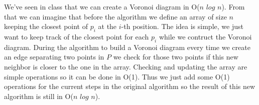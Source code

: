 We've seen in class that we can create a Voronoi diagram in O($n$ $log$ $n$). From that we can imagine that before the algorithm we define an array of size $n$ keeping the closest point of $p_i$ at the $i$-th position. The idea is simple, we just want to keep track of the closest point for each $p_i$ while we contruct the Voronoi diagram. During the algorithm to build a Voronoi diagram every time we create an edge separating two points in $P$ we check for those two points if this new neighbor is closer to the one in the array. Checking and updating the array are simple operations so it can be done in O(1). Thus we just add some O(1) operations for the current steps in the original algorithm so the result of this new algorithm is still in O($n$ $log$ $n$).